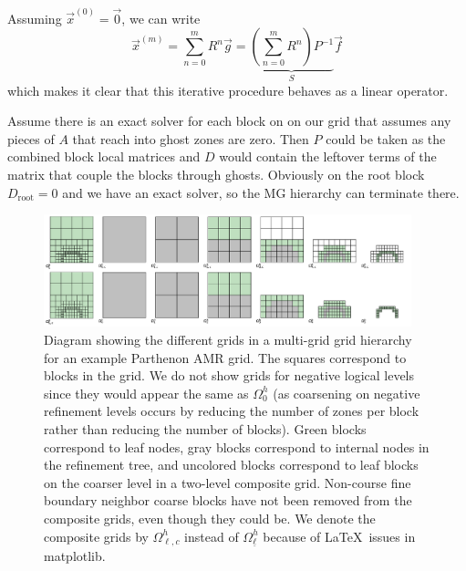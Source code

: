 \documentclass{article}
\begin{document}
Assuming $\vec{x}^{(0)} = \vec{0}$, we can write 
\begin{equation}
\vec{x}^{(m)} = \sum_{n=0}^m R^n \vec{g} = \underbrace{\left(\sum_{n=0}^m R^n \right) P^{-1}}_{S} \vec{f} 
\end{equation} 
which makes it clear that this iterative procedure behaves as a linear operator. 

Assume there is an exact solver for each block on on our grid that assumes any pieces of $A$ that reach into ghost zones are zero. Then $P$ could be taken as the combined block local matrices and $D$ would contain the leftover terms of the matrix that couple the blocks through ghosts. Obviously on the root block $D_\text{root} = 0$ and we have an exact solver, so the MG hierarchy can terminate there. 

\begin{figure}[tb]
    \centering
    \includegraphics[width=0.95\textwidth]{MG_grid_hierarchy.pdf}
    \caption{Diagram showing the different grids in a multi-grid grid hierarchy for an example Parthenon AMR grid. The squares correspond to blocks in the grid. We do not show grids for negative logical levels since they would appear the same as $\Omega^h_0$ (as coarsening on negative refinement levels occurs by reducing the number of zones per block rather than reducing the number of blocks). Green blocks correspond to leaf nodes, gray blocks correspond to internal nodes in the refinement tree, and uncolored blocks correspond to leaf blocks on the coarser level in a two-level composite grid. Non-course fine boundary neighbor coarse blocks have not been removed from the composite grids, even though they could be. We denote the composite grids by $\Omega^h_{\ell,c}$ instead of $\Omega^h_{\underline{\ell}}$ because of \LaTeX \, issues in matplotlib.}
    \label{fig:grid_hierarchy}
\end{figure}
\end{document}

